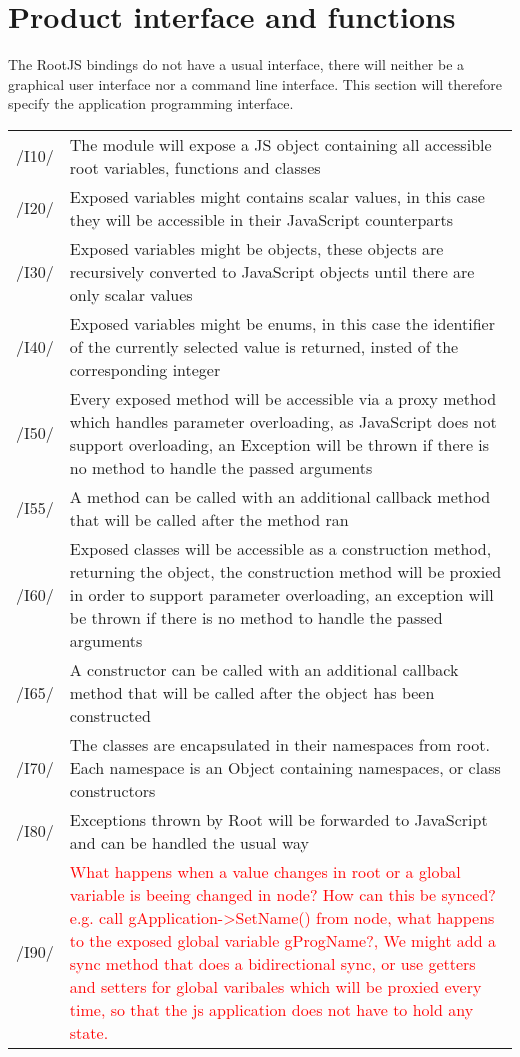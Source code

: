 \chapter{Product interface and functions}
The RootJS bindings do not have a usual interface, there will neither be a graphical user interface nor a command line interface.
This section will therefore specify the application programming interface.


\begin{longtable}{|p{1cm} | p{10cm}|}
   \hline
  /I10/ & The module will expose a JS object containing all accessible root variables, functions and classes \\
  /I20/ & Exposed variables might contains scalar values, in this case they will be accessible in their JavaScript counterparts \\
  /I30/ & Exposed variables might be objects, these objects are recursively converted to JavaScript objects until there are only scalar values \\
  /I40/ & Exposed variables might be enums, in this case the identifier of the currently selected value is returned, insted of the corresponding integer \\
  /I50/ & Every exposed method will be accessible via a proxy method which handles parameter overloading, as JavaScript does not support overloading, an Exception will be thrown if there is no method to handle the passed arguments \\
  /I55/ & A method can be called with an additional callback method that will be called after the method ran \\
  /I60/ & Exposed classes will be accessible as a construction method, returning the object, the construction method will be proxied in order to support parameter overloading, an exception will be thrown if there is no method to handle the passed arguments \\
  /I65/ & A constructor can be called with an additional callback method that will be called after the object has been constructed \\
  /I70/ & The classes are encapsulated in their namespaces from root. Each namespace is an Object containing namespaces, or class constructors \\
  /I80/ & Exceptions thrown by Root will be forwarded to JavaScript and can be handled the usual way \\
  /I90/ & \textcolor{red}{What happens when a value changes in root or a global variable is beeing changed in node? How can this be synced? e.g. call gApplication->SetName() from node, what happens to the exposed global variable gProgName?, We might add a sync method that does a bidirectional sync, or use getters and setters for global varibales which will be proxied every time, so that the js application does not have to hold any state.} \\
   \hline
\end{longtable}
